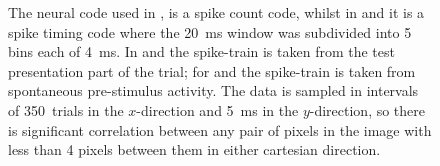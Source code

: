 \begin{figure}[htbp]
{The neural code used in \protect{}, \protect{} is a spike count code, whilst in \protect{} and \protect{} it is a spike timing code where the \SI{20}{ms} window was subdivided into 5 bins each of \SI{4}{ms}.
In \protect{} and \protect{} the spike-train is taken from the test presentation part of the trial;
for \protect{} and \protect{} the spike-train is taken from spontaneous pre-stimulus activity.
The data is sampled in intervals of \SI{350}{trials} in the $x$-direction and \SI{5}{ms} in the $y$-direction, so there is significant correlation between any pair of pixels in the image with less than 4 pixels between them in either cartesian direction.
}
    \label{fig:b1-trialwise}
\end{figure}



